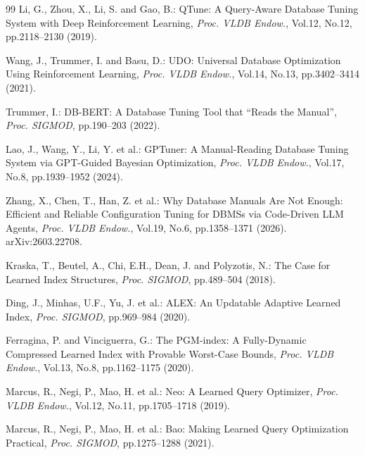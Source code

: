 \documentclass[submit,techrep,noauthor]{ipsj}
\begin{document}
\begin{thebibliography}{99}
Li, G., Zhou, X., Li, S. and Gao, B.: QTune: A Query-Aware Database Tuning System with Deep Reinforcement Learning, {\it Proc. VLDB Endow.}, Vol.12, No.12, pp.2118--2130 (2019).

Wang, J., Trummer, I. and Basu, D.: UDO: Universal Database Optimization Using Reinforcement Learning, {\it Proc. VLDB Endow.}, Vol.14, No.13, pp.3402--3414 (2021).

Trummer, I.: DB-BERT: A Database Tuning Tool that ``Reads the Manual'', {\it Proc. SIGMOD}, pp.190--203 (2022).

Lao, J., Wang, Y., Li, Y. et al.: GPTuner: A Manual-Reading Database Tuning System via GPT-Guided Bayesian Optimization, {\it Proc. VLDB Endow.}, Vol.17, No.8, pp.1939--1952 (2024).

Zhang, X., Chen, T., Han, Z. et al.: Why Database Manuals Are Not Enough: Efficient and Reliable Configuration Tuning for DBMSs via Code-Driven LLM Agents, {\it Proc. VLDB Endow.}, Vol.19, No.6, pp.1358--1371 (2026). arXiv:2603.22708.

Kraska, T., Beutel, A., Chi, E.H., Dean, J. and Polyzotis, N.: The Case for Learned Index Structures, {\it Proc. SIGMOD}, pp.489--504 (2018).

Ding, J., Minhas, U.F., Yu, J. et al.: ALEX: An Updatable Adaptive Learned Index, {\it Proc. SIGMOD}, pp.969--984 (2020).

Ferragina, P. and Vinciguerra, G.: The PGM-index: A Fully-Dynamic Compressed Learned Index with Provable Worst-Case Bounds, {\it Proc. VLDB Endow.}, Vol.13, No.8, pp.1162--1175 (2020).

Marcus, R., Negi, P., Mao, H. et al.: Neo: A Learned Query Optimizer, {\it Proc. VLDB Endow.}, Vol.12, No.11, pp.1705--1718 (2019).

Marcus, R., Negi, P., Mao, H. et al.: Bao: Making Learned Query Optimization Practical, {\it Proc. SIGMOD}, pp.1275--1288 (2021).


\end{thebibliography}
\end{document}
